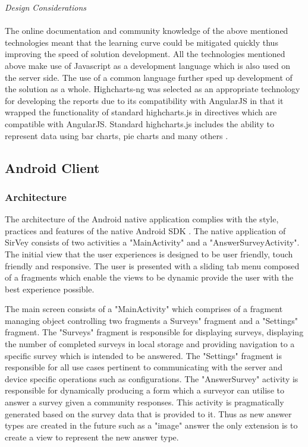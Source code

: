 \documentclass[12pt]{witseiepaper}
\begin{document}
\textit{Design Considerations} \\\\
The online documentation and community knowledge of the above mentioned technologies meant that the learning curve could be mitigated quickly thus improving the speed of solution development. All the technologies mentioned above make use of Javascript as a development language which is also used on the server side. The use of a common language further sped up development of the solution as a whole. Highcharts-ng was selected as an appropriate technology for developing the reports due to its compatibility with AngularJS in that it wrapped the functionality of standard highcharts.js in directives which are compatible with AngularJS. Standard highcharts.js includes the ability to represent data using bar charts, pie charts and many others \cite{Highcharts}.

\subsection{Android Client}
\subsubsection{Architecture}
The architecture of the Android native application complies with the style, practices and features of the native Android SDK \cite{AndroidSDK}. The native application of SirVey consists of two activities a "MainActivity" and a "AnswerSurveyActivity". The initial view that the user experiences is designed to be user friendly, touch friendly and responsive. The user is presented with a sliding tab menu composed of a fragments which enable the views to be dynamic provide the user with the best experience possible. 

The main screen consists of a "MainActivity" which comprises of a fragment managing object controlling two fragments a Surveys" fragment and a "Settings" fragment. The "Surveys" fragment is responsible for displaying surveys, displaying the number of completed surveys in local storage and providing navigation to a specific survey which is intended to be answered. The "Settings" fragment is responsible for all use cases pertinent to communicating with the server and device specific operations such as configurations. The "AnswerSurvey" activity is responsible for dynamically producing a form which a surveyor can utilise to answer a survey given a community responses. This activity is pragmatically generated based on the survey data that is provided to it. Thus as new answer types are created in the future such as a "image" answer the only extension is to create a view to represent the new answer type. 
\end{document}
